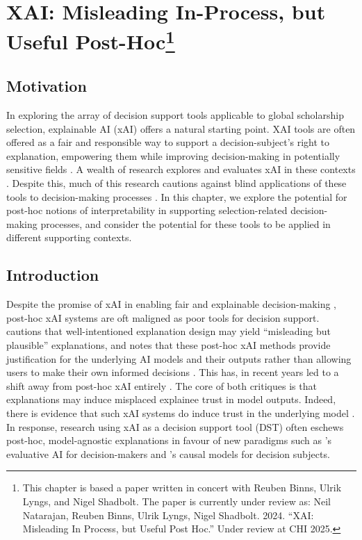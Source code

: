 \chapter[XAI]{\label{ch:xai}XAI: Misleading In-Process, but Useful Post-Hoc\footnote{This chapter is based a paper written in concert with Reuben Binns, Ulrik Lyngs, and Nigel Shadbolt. The paper is currently under review as: Neil Natarajan, Reuben Binns, Ulrik Lyngs, Nigel Shadbolt. 2024. “XAI: Misleading In Process, but Useful Post Hoc.” Under review at CHI 2025.}}

\minitoc

\section{Motivation}
In exploring the array of decision support tools applicable to global scholarship selection, explainable AI (xAI) offers a natural starting point. XAI tools are often offered as a fair and responsible way to support a decision-subject's right to explanation, empowering them while improving decision-making in potentially sensitive fields \cite{Goodman_Flaxman_2017}. A wealth of research explores and evaluates xAI in these contexts \cite{molnar_interpretable_2019,barocas_hidden_2020,wachter_counterfactual_2017,Barocas_Hood_Ziewitz_2013,raghavan2020mitigating}. Despite this, much of this research cautions against blind applications of these tools to decision-making processes \cite{Lipton,miller_explainable_2023,kumar_problems_2020,Bastounis_Campodonico_vanderSchaar_Adcock_Hansen_2024}. In this chapter, we explore the potential for post-hoc notions of interpretability in supporting selection-related decision-making processes, and consider the potential for these tools to be applied in different supporting contexts.

\section{Introduction}
Despite the promise of xAI in enabling fair and explainable decision-making \cite{Goodman_Flaxman_2017}, post-hoc xAI systems are oft maligned as poor tools for decision support. \textcite{Lipton} cautions that well-intentioned explanation design may yield ``misleading but plausible'' explanations, and \textcite{miller_explainable_2023} notes that these post-hoc xAI methods provide justification for the underlying AI models and their outputs rather than allowing users to make their own informed decisions \cite{miller_explainable_2023}. This has, in recent years led to a shift away from post-hoc xAI entirely \cite{Lipton,miller_explainable_2023,kumar_problems_2020,Bastounis_Campodonico_vanderSchaar_Adcock_Hansen_2024}. The core of both critiques is that explanations may induce misplaced explainee trust in model outputs. Indeed, there is evidence that such xAI systems do induce trust in the underlying model \cite{lai_human_2019,jacobs_how_2021}. In response, research using xAI as a decision support tool (DST) often eschews post-hoc, model-agnostic explanations in favour of new paradigms such as \textcite{miller_explainable_2023}'s evaluative AI for decision-makers and \textcite{karimi_algorithmic_2021}'s causal models for decision subjects.

